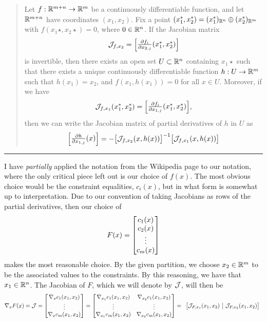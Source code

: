 \begin{solution}
\begin{quote}
        Let $f: \mathbb{R}^{m+n} \rightarrow \mathbb{R}^m$ be a continuously differentiable function, and let $\mathbb{R}^{m + n}$ have coordinates $(x_1, x_2)$. Fix a point $(x_1^{*}, x_2^{*}) = (x_1^{*})_{\mathbb{R}^n} \oplus (x_2^{*})_{\mathbb{R}^m}$ with $f(x_1\star, x_2\star) = 0$, where $0 \in \mathbb{R}^n$. If the Jacobian matrix
        \[\scJ_{f, x_2} = \mqty[\frac{\partial f_i}{\partial x_{2, j}}(x_1\star, x_2\star)]\]
        is invertible, then there exists an open set $U \subset \mathbb{R}^n$ containing $x_1\star$ such that there exists a unique continuously differentiable function $h: U\rightarrow \mathbb{R}^m$ such that $h(x_1) = x_2$, and $f(x_1, h(x_1)) = 0$ for all $x \in U$. Moreover, if we have 
        \[\scJ_{f, x_1}(x_1\star, x_2\star) = \mqty[\frac{\partial f_i}{\partial x_{1, j}}(x_1\star, x_2\star)],\]
        then we can write the Jacobian matrix of partial derivatives of $h$ in $U$ as 
        \[\mqty[\frac{\partial h}{\partial x_{1, j}}(x)] = -\mqty[\scJ_{f, x_2}(x, h(x))]\inv \mqty[\scJ_{f, x_1}(x, h(x))]\]
    \vspace{-15mm}
    \end{quote}
    \begin{center}\rule{17cm}{0.1mm}\end{center}
    I have \textit{partially} applied the notation from the Wikipedia page to our notation, where the only critical piece left out is our choice of $f(x)$. The most obvious choice would be the constraint equalities, $c_i(x)$, but in what form is somewhat up to interpretation. Due to our convention of taking Jacobians as rows of the partial derivatives, then our choice of 
    \[F(x) = \mqty[c_1(x)\\c_2(x)\\\vdots\\c_m(x)]\]
    makes the most reasonable choice. By the given partition, we choose $x_2 \in \mathbb{R}^m$ to be the associated values to the constraints. By this reasoning, we have that $x_1 \in \mathbb{R}^n$. The Jacobian of $F$, which we will denote by $\mathcal{J}$, will then be 
    \[\grad_x F (x) = \scJ = \mqty[\grad_x c_1(x_1, x_2)\\\vdots\\ \grad_x c_m(x_1, x_2)] = \mqty[\grad_{x_1} c_1(x_1, x_2) & \grad_{x_2} c_1(x_1, x_2)\\\vdots&\vdots\\ \grad_{x_1} c_m(x_1, x_2) & \grad_{x_2} c_m(x_1, x_2)] = \begin{array}{c|c}
        \big[\scJ_{F, x_1}(x_1, x_2) & \scJ_{F, x_2}(x_1, x_2)\big]
    \end{array}\]

\end{solution}

